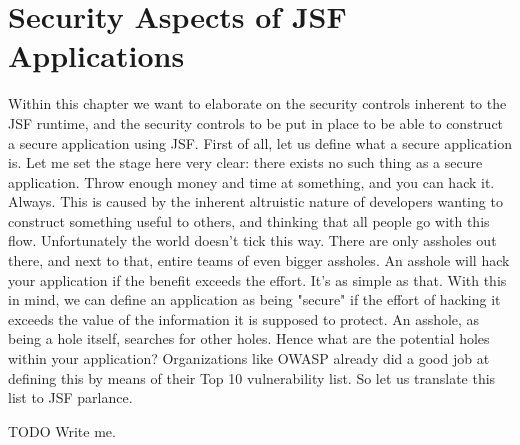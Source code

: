 %

\chapter{Security Aspects of JSF Applications}
Within this chapter we want to elaborate on the security controls inherent to the JSF runtime, and the security controls to be put in place to be able to construct a secure application using JSF.
First of all, let us define what a secure application is.
Let me set the stage here very clear: there exists no such thing as a secure application.
Throw enough money and time at something, and you can hack it.
Always.
This is caused by the inherent altruistic nature of developers wanting to construct something useful to others, and thinking that all people go with this flow.
Unfortunately the world doesn't tick this way.
There are only assholes out there, and next to that, entire teams of even bigger assholes.
An asshole will hack your application if the benefit exceeds the effort.
It's as simple as that.
With this in mind, we can define an application as being "secure" if the effort of hacking it exceeds the value of the information it is supposed to protect.
An asshole, as being a hole itself, searches for other holes.
Hence what are the potential holes within your application?
Organizations like OWASP already did a good job at defining this by means of their Top 10 vulnerability list.
So let us translate this list to JSF parlance.

\begin{TODO}{TODO}
	Write me.
\end{TODO}



